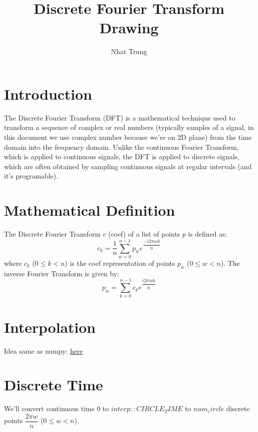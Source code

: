 \documentclass{article}
\title{Discrete Fourier Transform Drawing}
\author{Nhat Trung}
\begin{document}
\section{Introduction}
The Discrete Fourier Transform (DFT) is a mathematical technique used to transform a sequence of complex or real numbers (typically samples of a signal, in this document we use complex number because we're on 2D plane) from the time domain into the frequency domain. Unlike the continuous Fourier Transform, which is applied to continuous signals, the DFT is applied to discrete signals, which are often obtained by sampling continuous signals at regular intervals (and it's programable).

\section{Mathematical Definition}
The Discrete Fourier Transform $c$ (coef) of a list of points $p$ is defined as:
\begin{equation}
    c_k = \dfrac{1}{n} \sum_{w=0}^{n-1} p_w e^{\dfrac{-i2\pi w k}{n}}
\end{equation}
where $c_k$ ($0\leq k < n$) is the coef representation of points $p_w$ ($0\leq w < n$).
The inverse Fourier Transform is given by:
\begin{equation}
    p_w = \sum_{k=0}^{n-1} c_k e^{\dfrac{i2\pi w k}{n}}
\end{equation}

\section{Interpolation}
Idea same as numpy: \href{https://numpy.org/doc/stable/reference/generated/numpy.interp.html}{here}

\section{Discrete Time}
We'll convert continuous time $0$ to $interp::CIRCLE_TIME$ to $num_circle$ discrete points $\dfrac{2\pi w}{n}$ ($0\leq w < n$).
\end{document}
